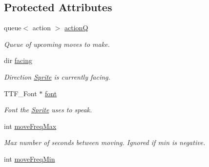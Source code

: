 \subsection*{Protected Attributes}
\begin{DoxyCompactItemize}
\item 
queue$<$ action $>$ \hyperlink{class_sprite_a8b183d19c55c1f0928075bd2cb926f68}{actionQ}\hypertarget{class_sprite_a8b183d19c55c1f0928075bd2cb926f68}{}\label{class_sprite_a8b183d19c55c1f0928075bd2cb926f68}

\begin{DoxyCompactList}\small\item\em Queue of upcoming moves to make. \end{DoxyCompactList}\item 
dir \hyperlink{class_sprite_a40357a4e61f454decf1970929e9d2d0c}{facing}\hypertarget{class_sprite_a40357a4e61f454decf1970929e9d2d0c}{}\label{class_sprite_a40357a4e61f454decf1970929e9d2d0c}

\begin{DoxyCompactList}\small\item\em Direction \hyperlink{class_sprite}{Sprite} is currently facing. \end{DoxyCompactList}\item 
T\+T\+F\+\_\+\+Font $\ast$ \hyperlink{class_sprite_aa9beec56e0e61eb611b204364fe446ce}{font}\hypertarget{class_sprite_aa9beec56e0e61eb611b204364fe446ce}{}\label{class_sprite_aa9beec56e0e61eb611b204364fe446ce}

\begin{DoxyCompactList}\small\item\em Font the \hyperlink{class_sprite}{Sprite} uses to \textquotesingle{}speak\textquotesingle{}. \end{DoxyCompactList}\item 
int \hyperlink{class_sprite_a0834d9fd02051694b0412e6282354d8c}{move\+Freq\+Max}\hypertarget{class_sprite_a0834d9fd02051694b0412e6282354d8c}{}\label{class_sprite_a0834d9fd02051694b0412e6282354d8c}

\begin{DoxyCompactList}\small\item\em Max number of seconds between moving. Ignored if min is negative. \end{DoxyCompactList}\item 
int \hyperlink{class_sprite_a3a4228cece7d9e18b98e8b5397cd5183}{move\+Freq\+Min}\hypertarget{class_sprite_a3a4228cece7d9e18b98e8b5397cd5183}{}\label{class_sprite_a3a4228cece7d9e18b98e8b5397cd5183}


\end{DoxyCompactItemize}
